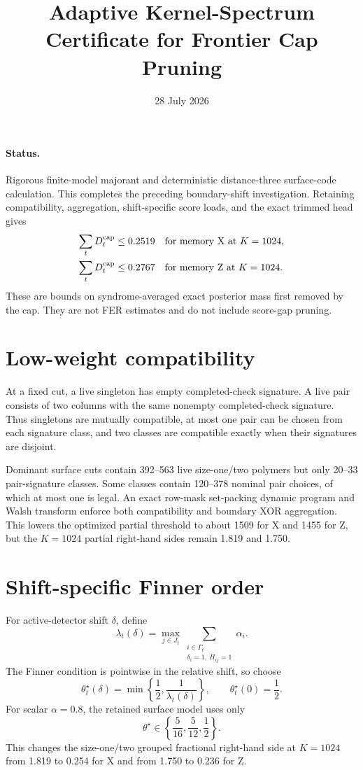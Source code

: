 \documentclass[11pt]{article}
\title{Adaptive Kernel-Spectrum Certificate for Frontier Cap Pruning}
\author{}
\date{28 July 2026}
\newcommand{\1}{\mathbf 1}
\begin{document}
\maketitle

\paragraph{Status.}
Rigorous finite-model majorant and deterministic distance-three surface-code
calculation.  This completes the preceding boundary-shift investigation.
Retaining compatibility, aggregation, shift-specific score loads, and the
exact trimmed head gives
\begin{align*}
 \sum_tD_t^{\rm cap}&\le0.2519
 &&\text{for memory X at }K=1024,\\
 \sum_tD_t^{\rm cap}&\le0.2767
 &&\text{for memory Z at }K=1024.
\end{align*}
These are bounds on syndrome-averaged exact posterior mass first removed by
the cap.  They are not FER estimates and do not include score-gap pruning.

\section{Low-weight compatibility}

At a fixed cut, a live singleton has empty completed-check signature.  A
live pair consists of two columns with the same nonempty completed-check
signature.  Thus singletons are mutually compatible, at most one pair can be
chosen from each signature class, and two classes are compatible exactly
when their signatures are disjoint.

Dominant surface cuts contain 392--563 live size-one/two polymers but only
20--33 pair-signature classes.  Some classes contain 120--378 nominal pair
choices, of which at most one is legal.  An exact row-mask set-packing
dynamic program and Walsh transform enforce both compatibility and boundary
XOR aggregation.  This lowers the optimized partial threshold to about 1509
for X and 1455 for Z, but the \(K=1024\) partial right-hand sides remain
1.819 and 1.750.

\section{Shift-specific Finner order}

For active-detector shift \(\delta\), define
\[
 \lambda_t(\delta)=
 \max_{j\in J_t}
 \sum_{\substack{i\in\Gamma_t\\\delta_i=1,\ H_{ij}=1}}\alpha_i.
\]
The Finner condition is pointwise in the relative shift, so choose
\[
 \theta_t^\star(\delta)=
 \min\left\{\frac12,\frac1{\lambda_t(\delta)}\right\},
 \qquad \theta_t^\star(0)=\frac12.
\]
For scalar \(\alpha=0.8\), the retained surface model uses only
\[
 \theta^\star\in\left\{\frac5{16},\frac5{12},\frac12\right\}.
\]
This changes the size-one/two grouped fractional right-hand side at
\(K=1024\) from 1.819 to 0.254 for X and from 1.750 to 0.236 for Z.
\end{document}

